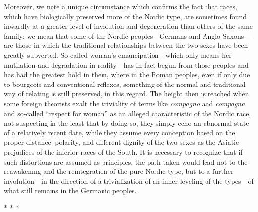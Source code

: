 Moreover, we note a unique circumstance which confirms the fact that races, which have biologically preserved more of the Nordic type, are sometimes found inwardly at a greater level of involution and degeneration than others of the same family: we mean that some of the Nordic peoples---Germans and Anglo-Saxons---are those in which the traditional relationships between the two sexes have been greatly subverted. So-called woman's emancipation---which only means her mutilation and degradation in reality---has in fact begun from those peoples and has had the greatest hold in them, where in the Roman peoples, even if only due to bourgeois and conventional reflexes, something of the normal and traditional way of relating is still preserved, in this regard. The height then is reached when some foreign theorists exalt the triviality of terms like \emph{compagno} and \emph{compagna} and so-called ``respect for woman'' as an alleged characteristic of the Nordic race, not suspecting in the least that by doing so, they simply echo an abnormal state of a relatively recent date, while they assume every conception based on the proper distance, polarity, and different dignity of the two sexes as the Asiatic prejudices of the inferior races of the South. It is necessary to recognize that if such distortions are assumed as principles, the path taken would lead not to the reawakening and the reintegration of the pure Nordic type, but to a further involution---in the direction of a trivialization of an inner leveling of the types---of what still remains in the Germanic peoples.



\begin{center}* * *\end{center}

